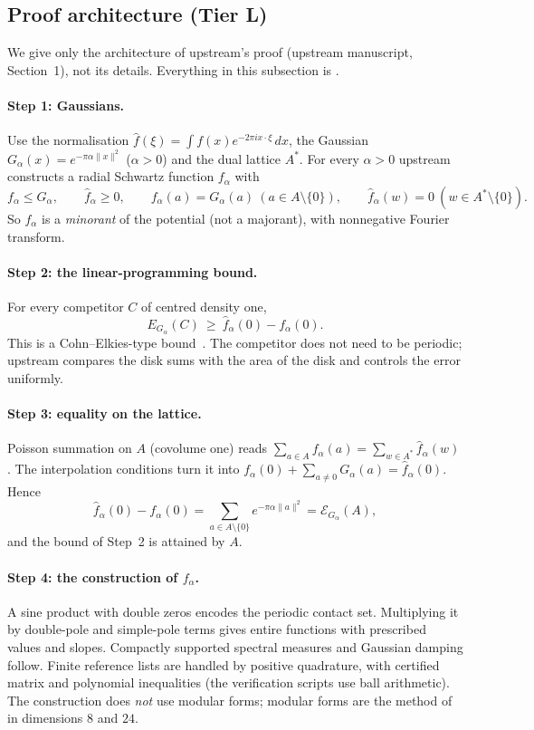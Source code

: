 \subsection{Proof architecture (Tier L)}
We give only the architecture of upstream's proof (upstream manuscript, Section~1), not its details. Everything in this
subsection is \tierL.

\paragraph{Step 1: Gaussians.} Use the normalisation $\hat f(\xi)=\int f(x)e^{-2\pi i x\cdot\xi}\,dx$, the Gaussian
$G_\alpha(x)=e^{-\pi\alpha\|x\|^2}$ ($\alpha>0$) and the dual lattice $A^*$. For every $\alpha>0$ upstream constructs a
radial Schwartz function $f_\alpha$ with
\[
f_\alpha\le G_\alpha,\qquad \hat f_\alpha\ge 0,\qquad f_\alpha(a)=G_\alpha(a)\ (a\in A\setminus\{0\}),\qquad
\hat f_\alpha(w)=0\ (w\in A^*\setminus\{0\}).
\]
So $f_\alpha$ is a \emph{minorant} of the potential (not a majorant), with nonnegative Fourier transform.

\paragraph{Step 2: the linear-programming bound.} For every competitor $C$ of centred density one,
\[
E_{G_\alpha}(C)\ \ge\ \hat f_\alpha(0)-f_\alpha(0).
\]
This is a Cohn--Elkies-type bound~\cite{ck,ckmrv}. The competitor does not need to be periodic; upstream compares the
disk sums with the area of the disk and controls the error uniformly.

\paragraph{Step 3: equality on the lattice.} Poisson summation on $A$ (covolume one) reads
$\sum_{a\in A}f_\alpha(a)=\sum_{w\in A^*}\hat f_\alpha(w)$. The interpolation conditions turn it into
$f_\alpha(0)+\sum_{a\neq0}G_\alpha(a)=\hat f_\alpha(0)$. Hence
\[
\hat f_\alpha(0)-f_\alpha(0)=\sum_{a\in A\setminus\{0\}}e^{-\pi\alpha\|a\|^2}=\mathcal{E}_{G_\alpha}(A),
\]
and the bound of Step~2 is attained by $A$.

\paragraph{Step 4: the construction of $f_\alpha$.} A sine product with double zeros encodes the periodic contact set.
Multiplying it by double-pole and simple-pole terms gives entire functions with prescribed values and slopes.
Compactly supported spectral measures and Gaussian damping follow. Finite reference lists are handled by positive
quadrature, with certified matrix and polynomial inequalities (the verification scripts use  ball
arithmetic). The construction does \emph{not} use modular forms; modular forms are the method of~\cite{ckmrv} in
dimensions $8$ and $24$.

